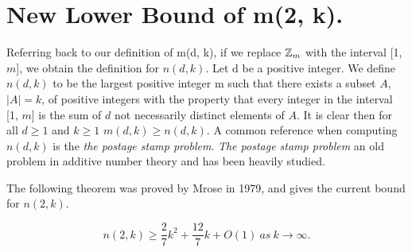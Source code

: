 \section{ New Lower Bound of m(2, k).}
Referring back to our definition of m(d, k), if we replace $\mbox{$\mathbb Z$}_m$ with the interval [1, $m$], we obtain the definition for $n(d, k)$. Let d be a positive integer. We define $n(d, k)$ to be the largest positive integer m such that there exists a subset $A$, $|A| = k$, of positive integers with the property that every integer in the interval [1, $m$] is the sum of $d$ not necessarily distinct elements of $A$. It is clear then for all $d \geq 1$ and $k \geq 1$ $m(d, k) \geq n(d, k)$. A common reference when computing $n(d, k)$ is the \emph{the postage stamp problem}. \emph{The postage stamp problem} an old problem in additive number theory and has been heavily studied. 

The following theorem was proved by Mrose in 1979, and gives the current bound for $n(2, k)$.
\begin{theorem}
\[
n(2, k) \geq \frac{2}{7}k^2 + \frac{12}{7}k + O(1)\  as \  k \to \infty.
\]
\end{theorem}


